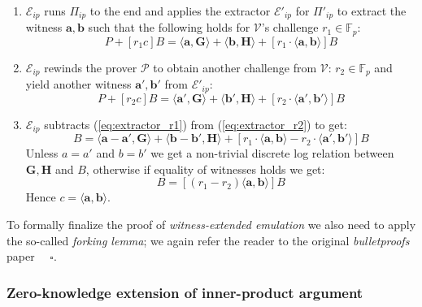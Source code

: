 \documentclass[../../book.tex]{subfiles}
\begin{document}
\begin{enumerate}
    \item $\mathcal{E}_{ip}$ runs $\Pi_{ip}$ to the end and applies the extractor $\mathcal{E}'_{ip}$ for $\Pi'_{ip}$ to extract the witness $\mathbf{a,b}$ such that the following holds for $\mathcal{V}$'s challenge $r_1 \in \mathbb{F}_p$:
        \begin{equation}
            P + [r_1c]B = \langle \mathbf{a,G} \rangle + \langle \mathbf{b,H} \rangle + [r_1 \cdot \langle \mathbf{a,b} \rangle]B
            \label{eq:extractor_r1}
        \end{equation}
    \item $\mathcal{E}_{ip}$ rewinds the prover $\mathcal{P}$ to obtain another challenge from $\mathcal{V}$: $r_2 \in \mathbb{F}_p$ and yield another witness $\mathbf{a',b'}$ from $\mathcal{E}'_{ip}$:
        \begin{equation}
            P + [r_2c]B = \langle \mathbf{a',G} \rangle + \langle \mathbf{b',H} \rangle + [r_2 \cdot \langle \mathbf{a',b'} \rangle]B
            \label{eq:extractor_r2}
        \end{equation}
        
    \item $\mathcal{E}_{ip}$ subtracts (\ref{eq:extractor_r1}) from (\ref{eq:extractor_r2}) to get:
        \begin{equation}
            [c(r_1 - r_2)]B = \langle \mathbf{a-a',G} \rangle + \langle \mathbf{b-b',H} \rangle + [r_1 \cdot \langle \mathbf{a,b} \rangle - r_2 \cdot \langle \mathbf{a',b'} \rangle]B
        \end{equation}
        Unless $a = a'$ and $b = b'$ we get a non-trivial discrete log relation between $\mathbf{G,H}$ and $B$, otherwise if equality of witnesses holds we get:
        \begin{equation}
            [(r_1 - r_2)c]B = [(r_1 - r_2) \langle \mathbf{a,b} \rangle]B
        \end{equation}
        Hence $c = \langle \mathbf{a,b} \rangle$.
\end{enumerate}

To formally finalize the proof of \textit{witness-extended emulation} we also need to apply the so-called \textit{forking lemma}; we again refer the reader to the original \textit{bulletproofs} paper \cite{bulletproofs} $\quad \square$.

\subsubsection{Zero-knowledge extension of inner-product argument}\label{subsection:alternative-zk-ip}
\end{document}
